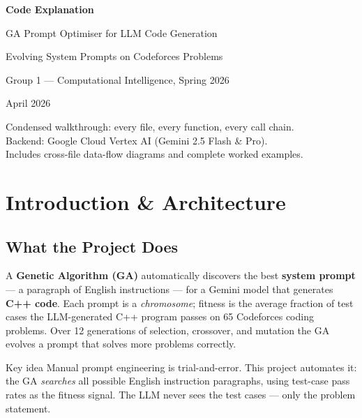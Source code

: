 \documentclass[11pt,a4paper]{report}
\begin{document}
\begin{titlepage}
\centering\vspace*{2.5cm}
{\Huge\bfseries Code Explanation\par}\vspace{0.6cm}
{\LARGE GA Prompt Optimiser for LLM Code Generation\par}\vspace{1cm}
{\Large Evolving System Prompts on Codeforces Problems\par}\vspace{2cm}
{\large Group 1 --- Computational Intelligence, Spring 2026\par}\vspace{0.8cm}
{\large April 2026\par}\vfill
{\small Condensed walkthrough: every file, every function, every call chain.\\
Backend: Google Cloud Vertex AI (Gemini 2.5 Flash \& Pro).\\
Includes cross-file data-flow diagrams and complete worked examples.}
\end{titlepage}

\tableofcontents\newpage

\chapter{Introduction \& Architecture}

\section{What the Project Does}

A \textbf{Genetic Algorithm (GA)} automatically discovers the best \textbf{system
prompt} --- a paragraph of English instructions --- for a Gemini model that generates
\textbf{C++ code}.  Each prompt is a \emph{chromosome}; fitness is the average fraction
of test cases the LLM-generated C++ program passes on 65 Codeforces coding problems.
Over 12 generations of selection, crossover, and mutation the GA evolves a prompt that
solves more problems correctly.

\begin{concept}{Key idea}
Manual prompt engineering is trial-and-error.  This project automates it: the GA
\emph{searches} all possible English instruction paragraphs, using test-case pass
rates as the fitness signal.  The LLM never sees the test cases --- only the problem
statement.
\end{concept}
\end{document}
